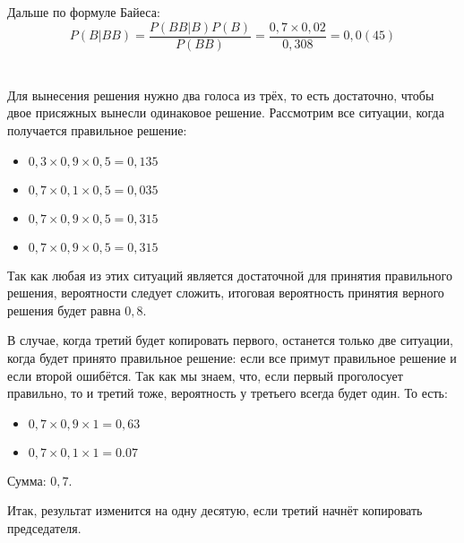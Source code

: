 \documentclass[a4paper,10pt]{article}
\begin{document}
Дальше по формуле Байеса:
$$
P(B|BB) = \frac{P(BB|B)P(B)}{P(BB)}
= \frac{0,7 \times 0,02}{0,308} = 0,0(45)
$$

\section{}
Для вынесения решения нужно два голоса из трёх, то есть достаточно, чтобы двое присяжных вынесли одинаковое решение. Рассмотрим все ситуации, когда получается правильное решение:
\begin{itemize}
 \item $0,3 \times 0,9 \times 0,5 = 0,135$
 \item $0,7 \times 0,1 \times 0,5 = 0,035$
 \item $0,7 \times 0,9 \times 0,5 = 0,315$
 \item $0,7 \times 0,9 \times 0,5 = 0,315$
\end{itemize}

Так как любая из этих ситуаций является достаточной для принятия правильного решения, вероятности следует сложить, итоговая вероятность принятия верного решения будет равна $0,8$.

В случае, когда третий будет копировать первого, останется только две ситуации, когда будет принято правильное решение: если все примут правильное решение и если второй ошибётся. Так как мы знаем, что, если первый проголосует правильно, то и третий тоже, вероятность у третьего всегда будет один. То есть:
\begin{itemize}
 \item $0,7 \times 0,9 \times 1 = 0,63$
 \item $0,7 \times 0,1 \times 1 = 0.07$
\end{itemize}

Сумма: $0,7$.

Итак, результат изменится на одну десятую, если третий начнёт копировать председателя.
\end{document}
